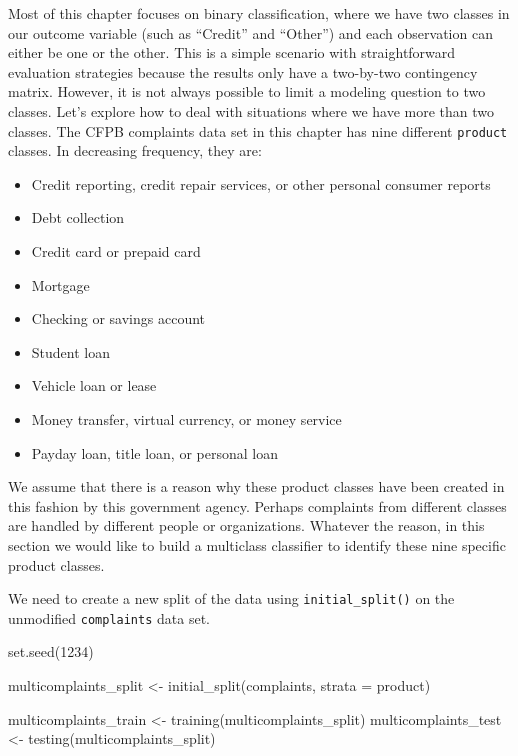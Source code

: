 \documentclass[
]{krantz}
\makeatletter
\newenvironment{Shaded}{\begin{snugshade}}{\end{snugshade}}
\newcommand{\AttributeTok}[1]{\textcolor[rgb]{0.77,0.63,0.00}{#1}}
\newcommand{\DecValTok}[1]{\textcolor[rgb]{0.00,0.00,0.81}{#1}}
\newcommand{\FunctionTok}[1]{\textcolor[rgb]{0.00,0.00,0.00}{#1}}
\newcommand{\NormalTok}[1]{#1}
\newcommand{\OtherTok}[1]{\textcolor[rgb]{0.56,0.35,0.01}{#1}}
\newenvironment{kframe}{%
\medskip{}
\setlength{\fboxsep}{.8em}
 \def\at@end@of@kframe{}%
 \ifinner\ifhmode%
  \def\at@end@of@kframe{\end{minipage}}%
  \begin{minipage}{\columnwidth}%
 \fi\fi%
 \def\FrameCommand##1{\hskip\@totalleftmargin \hskip-\fboxsep
 \colorbox{shadecolor}{##1}\hskip-\fboxsep
     \hskip-\linewidth \hskip-\@totalleftmargin \hskip\columnwidth}%
 \MakeFramed {\advance\hsize-\width
   \@totalleftmargin\z@ \linewidth\hsize
   \@setminipage}}%
 {\par\unskip\endMakeFramed%
 \at@end@of@kframe}
\renewenvironment{Shaded}{\begin{kframe}}{\end{kframe}}
\makeatother
\begin{document}
Most of this chapter focuses on binary classification, where we have two classes in our outcome variable (such as ``Credit'' and ``Other'') and each observation can either be one or the other. This is a simple scenario with straightforward evaluation strategies because the results only have a two-by-two contingency matrix.
However, it is not always possible to limit a modeling question to two classes. Let's explore how to deal with situations where we have more than two classes.
The CFPB complaints data set in this chapter has nine different \texttt{product} classes. In decreasing frequency, they are:

\begin{itemize}
\item
  Credit reporting, credit repair services, or other personal consumer reports
\item
  Debt collection
\item
  Credit card or prepaid card
\item
  Mortgage
\item
  Checking or savings account
\item
  Student loan
\item
  Vehicle loan or lease
\item
  Money transfer, virtual currency, or money service
\item
  Payday loan, title loan, or personal loan
\end{itemize}

We assume that there is a reason why these product classes have been created in this fashion by this government agency.
Perhaps complaints from different classes are handled by different people or organizations.
Whatever the reason, in this section we would like to build a multiclass classifier to identify these nine specific product classes.

We need to create a new split of the data using \texttt{initial\_split()} on the unmodified \texttt{complaints} data set.

\begin{Shaded}
\begin{Highlighting}[]
\FunctionTok{set.seed}\NormalTok{(}\DecValTok{1234}\NormalTok{)}

\NormalTok{multicomplaints\_split }\OtherTok{\textless{}{-}} \FunctionTok{initial\_split}\NormalTok{(complaints, }\AttributeTok{strata =}\NormalTok{ product)}

\NormalTok{multicomplaints\_train }\OtherTok{\textless{}{-}} \FunctionTok{training}\NormalTok{(multicomplaints\_split)}
\NormalTok{multicomplaints\_test }\OtherTok{\textless{}{-}} \FunctionTok{testing}\NormalTok{(multicomplaints\_split)}
\end{Highlighting}
\end{Shaded}
\end{document}
